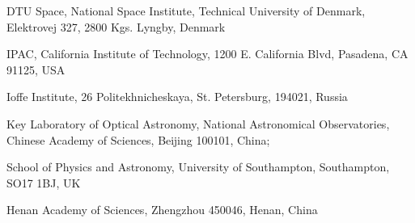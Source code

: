 \documentclass{nature_plusfigure}
\begin{document}
\begin{small}
\begin{affiliations}
\item DTU Space, National Space Institute, Technical University of Denmark, Elektrovej 327, 2800 Kgs. Lyngby, Denmark
\item IPAC, California Institute of Technology, 1200 E. California Blvd, Pasadena, CA 91125, USA
\item Ioffe Institute, 26 Politekhnicheskaya, St. Petersburg, 194021, Russia
\item Key Laboratory of Optical Astronomy, National Astronomical Observatories, Chinese Academy of Sciences, Beĳing 100101, China; 
\item School of Physics and Astronomy, University of Southampton, Southampton, SO17 1BJ, UK
\item Henan Academy of Sciences, Zhengzhou 450046, Henan, China

\end{affiliations}
\end{small}
\end{document}
